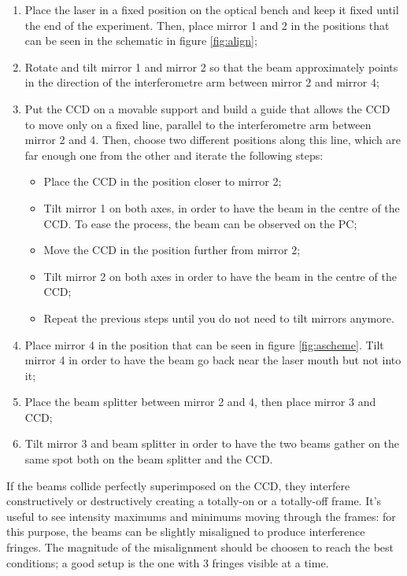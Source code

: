 \documentclass[a4paper, 12pt]{article}
\begin{document}
\begin{enumerate}
    \item Place the laser in a fixed position on the optical bench and keep it fixed until the end of the experiment. Then, place mirror 1 and 2 in the positions that can be seen in the schematic in figure \ref{fig:align};
    \item  Rotate and tilt mirror 1 and mirror 2 so that the beam approximately points in the direction of the interferometre arm between mirror 2 and mirror 4;
    \item \label{step:alignment}Put the CCD on a movable support and build a guide that allows the CCD to move only on a fixed line, parallel to the interferometre arm between mirror 2 and 4. Then, choose two different positions along this line, which are far enough one from the other and iterate the following steps:
    \begin{itemize}
        \item Place the CCD in the position closer to mirror 2;
        \item Tilt mirror 1 on both axes, in order to have the beam in the centre of the CCD. To ease the process, the beam can be observed on the PC; %
        \item Move the CCD in the position further from mirror 2;
        \item Tilt mirror 2 on both axes in order to have the beam in the centre of the CCD;
        \item Repeat the previous steps until you do not need to tilt mirrors anymore. 
    \end{itemize}
    \item Place mirror 4 in the position that can be seen in figure \ref{fig:ascheme}. Tilt mirror 4 in order to have the beam go back near the laser mouth but not into it;
    \item Place the beam splitter between mirror 2 and 4, then place mirror 3 and CCD;
    \item Tilt mirror 3 and beam splitter in order to have the two beams gather on the same spot both on the beam splitter and the CCD.
    \end{enumerate}
    
If the beams collide perfectly superimposed on the CCD, they interfere constructively or destructively creating a totally-on or a totally-off frame. It's useful to see intensity maximums and minimums moving through the frames: for this purpose, the beams can be slightly misaligned to produce interference fringes. The magnitude of the misalignment should be choosen to reach the best conditions; a good setup is the one with 3 fringes visible at a time.
\end{document}
